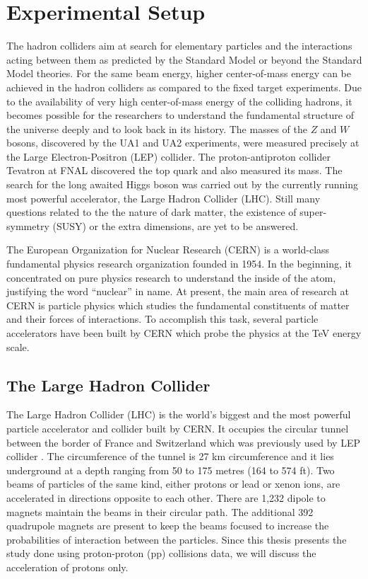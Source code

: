 \chapter{Experimental Setup}
\label{chap:Detector}
The hadron colliders aim at search for elementary particles and the interactions acting between them as predicted by the Standard Model or beyond the Standard Model theories. For the same beam energy, higher center-of-mass energy can be achieved in the hadron colliders as compared to the fixed target experiments. Due to the availability of very high center-of-mass energy of the colliding hadrons, it becomes possible for the researchers to understand the fundamental structure of the universe deeply and to look back in its history. The masses of the $Z$ and $W$ bosons, discovered by the UA1 and UA2 experiments, were measured precisely at the Large Electron-Positron (LEP) collider. The proton-antiproton collider Tevatron at FNAL discovered the top quark and also measured its mass. The search for the long awaited Higgs boson was carried out by the currently running most powerful accelerator, the Large Hadron Collider (LHC). Still many questions related to the the nature of dark matter, the existence of super-symmetry (SUSY) or the extra dimensions, are yet to be answered. 

The European Organization for Nuclear Research (CERN) is a world-class fundamental physics research organization founded in 1954. In the beginning, it concentrated on pure physics research to understand the inside of the atom, justifying the word ``nuclear'' in name. At present, the main area of research at CERN is particle physics which studies the fundamental constituents of matter and their forces of interactions. To accomplish this task, several particle accelerators have been built by CERN which probe the physics at the TeV energy scale.

\section{The Large Hadron Collider}
The Large Hadron Collider (LHC) \cite{Evans:2008zzb} is the world's biggest and the most powerful particle accelerator and collider built by CERN. It occupies the circular tunnel between the border of France and Switzerland which was previously used by LEP collider \cite{LEP}. The circumference of the tunnel is 27 km circumference and it lies underground at a depth ranging from 50 to 175 metres (164 to 574 ft). Two beams of particles of the same kind, either protons or lead or xenon ions, are accelerated in directions opposite to each other. There are 1,232 dipole to magnets maintain the beams in their circular path. The additional 392 quadrupole magnets are present to keep the beams focused to increase the probabilities of interaction between the particles. Since this thesis presents the study done using proton-proton (pp) collisions data, we will discuss the acceleration of protons only. 

